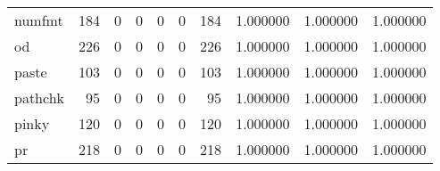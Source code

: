 \begin{tabular}{lrrrrrrrrr}
numfmt    &                                                184 &                                                  0 &                                                  0 &                                                  0 &                                                  0 &                                                184 &                                           1.000000 &                               1.000000 &                             1.000000 \\
od        &                                                226 &                                                  0 &                                                  0 &                                                  0 &                                                  0 &                                                226 &                                           1.000000 &                               1.000000 &                             1.000000 \\
paste     &                                                103 &                                                  0 &                                                  0 &                                                  0 &                                                  0 &                                                103 &                                           1.000000 &                               1.000000 &                             1.000000 \\
pathchk   &                                                 95 &                                                  0 &                                                  0 &                                                  0 &                                                  0 &                                                 95 &                                           1.000000 &                               1.000000 &                             1.000000 \\
pinky     &                                                120 &                                                  0 &                                                  0 &                                                  0 &                                                  0 &                                                120 &                                           1.000000 &                               1.000000 &                             1.000000 \\
pr        &                                                218 &                                                  0 &                                                  0 &                                                  0 &                                                  0 &                                                218 &                                           1.000000 &                               1.000000 &                             1.000000 \\

\end{tabular}
